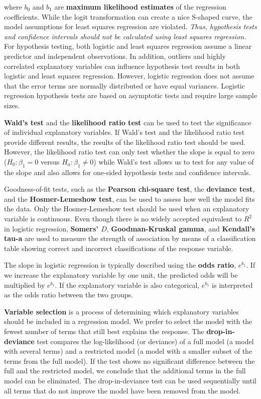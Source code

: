 \documentclass[
]{report}
\begin{document}
where \(b_0\) and \(b_1\) are \textbf{maximum likelihood estimates} of the regression coefficients. While the logit transformation can create a nice S-shaped curve, the model assumptions for least squares regression are violated. \textit{Thus, hypothesis tests and confidence intervals should not be calculated using least squares regression.} For hypothesis testing, both logistic and least squares regression assume a linear predictor and independent observations. In addition, outliers and highly correlated explanatory variables can influence hypothesis test results in both logistic and least squares regression. However, logistic regression does not assume that the error terms are normally distributed or have equal variances. Logistic regression hypothesis tests are based on asymptotic tests and require large sample sizes.

\textbf{Wald's test} and the \textbf{likelihood ratio test} can be used to test the significance of individual explanatory variables. If Wald's test and the likelihood ratio test provide different results, the results of the likelihood ratio test should be used. However, the likelihood ratio test can only test whether the slope is equal to zero (\(H_0: \beta_1 = 0\) versus \(H_a: \beta_1 \neq 0\)) while Wald's test allows us to test for any value of the slope and also allows for one-sided hypothesis tests and confidence intervals.

Goodness-of-fit tests, such as the \textbf{Pearson chi-square test}, the \textbf{deviance test}, and the \textbf{Hosmer-Lemeshow test}, can be used to assess how well the model fits the data. Only the Hosmer-Lemeshow test should be used when an explanatory variable is continuous. Even though there is no widely accepted equivalent to \(R^2\) in logistic regression, \textbf{Somers' \(D\)}, \textbf{Goodman-Kruskal gamma}, and \textbf{Kendall's tau-a} are used to measure the strength of association by means of a classification table showing correct and incorrect classifications of the response variable.

The slope in logistic regression is typically described using the \textbf{odds ratio}, \(e^{b_1}\). If we increase the explanatory variable by one unit, the predicted odds will be multiplied by \(e^{b_1}\). If the explanatory variable is also categorical, \(e^{b_1}\) is interpreted as the odds ratio between the two groups.

\textbf{Variable selection} is a process of determining which explanatory variables should be included in a regression model. We prefer to select the model with the fewest number of terms that still best explains the response. The \textbf{drop-in-deviance} test compares the log-likelihood (or deviance) of a full model (a model with several terms) and a restricted model (a model with a smaller subset of the terms from the full model). If the test shows no significant difference between the full and the restricted model, we conclude that the additional terms in the full model can be eliminated. The drop-in-deviance test can be used sequentially until all terms that do not improve the model have been removed from the model.
\end{document}

